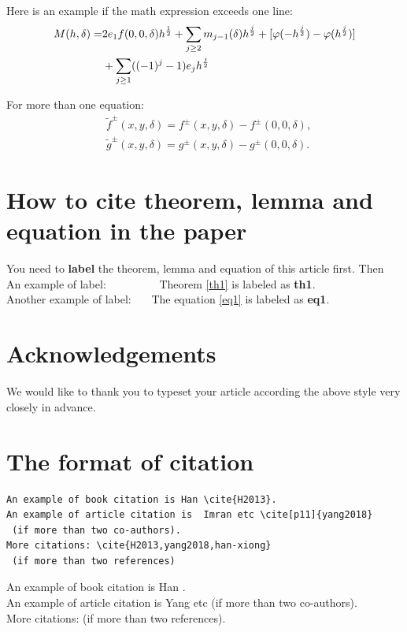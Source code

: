 \documentclass{jnma}
\begin{document}
Here is an example if the math expression exceeds one line:
\begin{align}
{M}(h,\delta)=&2e_1{f}(0,0,\delta)h^{\frac{1}{2}}+\sum\limits_{j\geq2}m_{j-1}(\delta)h^{\frac{j}{2}}+[\varphi(-h^{\frac{j}{2}})-\varphi(h^{\frac{j}{2}})] \notag\\
&+\sum\limits_{j\geq1}((-1)^j-1)e_jh^{\frac{j}{2}} \label{eq1}
\end{align}

For more than one equation:
\begin{align*}
&\widetilde{f}^{\pm}(x,y,\delta)={f}^{\pm}(x,y,\delta)-{f}^{\pm}(0,0,\delta),\\
&\widetilde{g}^{\pm}(x,y,\delta)={g}^{\pm}(x,y,\delta)-{g}^{\pm}(0,0,\delta).
\end{align*}


\section{How to cite theorem, lemma and equation in the paper}

You need to {\bf label} the theorem, lemma and equation of this article first. Then \\

An example of label: ~~~~~~~~~Theorem \ref{th1} is labeled as {\bf th1}. \\

Another example of label: ~~~The equation \eqref{eq1} is labeled as {\bf eq1}.

\section*{Acknowledgements}
We would like to thank you to typeset your article according the above style very closely in
advance.


\section*{The format of citation}
\begin{verbatim}
An example of book citation is Han \cite{H2013}.
An example of article citation is  Imran etc \cite[p11]{yang2018}
 (if more than two co-authors).
More citations: \cite{H2013,yang2018,han-xiong}
 (if more than two references)
 \end{verbatim}

\vskip 2mm
\vskip 2mm
\noindent An example of book citation is Han \cite{H2013}. \\
An example of article citation is  Yang etc \cite[p11]{yang2018}
 (if more than two co-authors).\\
More citations: \cite{H2013,yang2018,han-xiong} (if more than two references).
\end{document}

